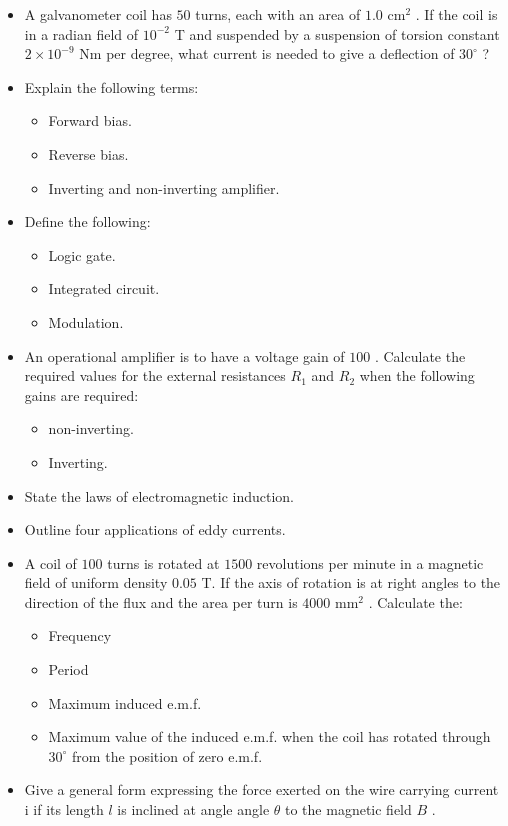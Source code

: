 \documentclass{article}
\begin{document}
\begin{itemize}
\item A galvanometer coil has $ 50$ turns, each with an area of $ 1.0 $ cm$ ^{2}$ .  If the coil is in a radian field of $ 10^{-2}$ T and suspended by a suspension of torsion constant $ 2 \times 10^{-9}$ Nm per degree, what current is needed to give a deflection of $ 30^{\circ}$ ?
\item Explain the following terms:
 \begin{itemize}
\item Forward bias.
\item Reverse bias.
\item Inverting and non-inverting amplifier. 
\end{itemize}
\item Define the following:
 \begin{itemize}
\item Logic gate.
\item Integrated circuit.
\item Modulation.
\end{itemize}
\item An operational amplifier is to have a voltage gain of $ 100$ .  Calculate the required values for the external resistances $ R_{1}$ and $ R_{2}$ when the following gains are required:
 \begin{itemize}
\item non-inverting.
\item Inverting.
\end{itemize}
\item State the laws of electromagnetic induction.
\item Outline four applications of eddy currents.
\item A coil of $ 100$ turns is rotated at $ 1500$ revolutions per minute in a magnetic field of uniform density $ 0.05$ T.  If the axis of rotation is at right angles to the direction of the flux and the area per turn is $ 4000 $ mm$ ^{2}$ .  Calculate the:
 \begin{itemize}
\item Frequency
\item Period
\item Maximum induced e.m.f.
\item Maximum value of the induced e.m.f. when the coil has rotated through $ 30^{\circ}$ from the position of zero e.m.f.
\end{itemize}
\item Give a general form expressing the force exerted on the wire carrying current i if its length $ l$ is inclined at angle angle $ \theta $ to the magnetic field $ B$ .  

\end{itemize}
\end{document}
